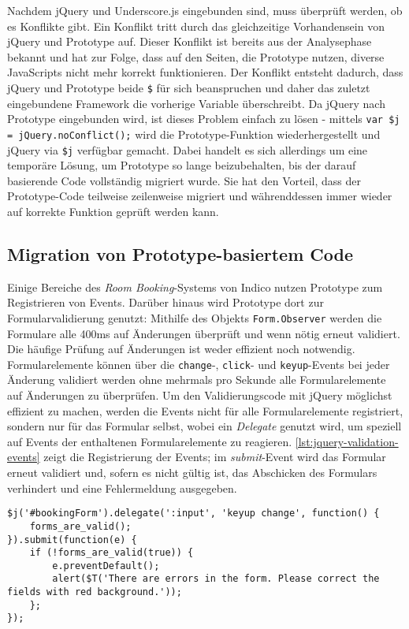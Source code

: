 Nachdem jQuery und Underscore.js eingebunden sind, muss überprüft werden, ob es Konflikte gibt. Ein
Konflikt tritt durch das gleichzeitige Vorhandensein von jQuery und Prototype auf. Dieser Konflikt
ist bereits aus der Analysephase bekannt und hat zur Folge, dass auf den Seiten, die Prototype
nutzen, diverse JavaScripts nicht mehr korrekt funktionieren. Der Konflikt entsteht dadurch, dass
jQuery und Prototype beide \lstinline{$} für sich beanspruchen und daher das zuletzt eingebundene
Framework die vorherige Variable überschreibt. Da jQuery nach Prototype eingebunden wird, ist dieses
Problem einfach zu lösen - mittels \lstinline{var $j = jQuery.noConflict();} wird die
Prototype-Funktion wiederhergestellt und jQuery via \lstinline{$j} verfügbar gemacht. Dabei handelt
es sich allerdings um eine temporäre Lösung, um Prototype so lange beizubehalten, bis der darauf
basierende Code vollständig migriert wurde. Sie hat den Vorteil, dass der Prototype-Code teilweise
zeilenweise migriert und währenddessen immer wieder auf korrekte Funktion geprüft werden kann.

\subsection{Migration von Prototype-basiertem Code}

Einige Bereiche des \emph{Room Booking}-Systems von Indico nutzen Prototype zum Registrieren von
Events. Darüber hinaus wird Prototype dort zur Formularvalidierung genutzt: Mithilfe des Objekts
\lstinline{Form.Observer} werden die Formulare alle 400ms auf Änderungen überprüft und wenn nötig
erneut validiert. Die häufige Prüfung auf Änderungen ist weder effizient noch notwendig.
Formularelemente können über die \lstinline{change}-, \lstinline{click}- und
\lstinline{keyup}-Events bei jeder Änderung validiert werden ohne mehrmals pro Sekunde alle
Formularelemente auf Änderungen zu überprüfen. Um den Validierungscode mit jQuery möglichst
effizient zu machen, werden die Events nicht für alle Formularelemente registriert, sondern nur für
das Formular selbst, wobei ein \emph{Delegate} genutzt wird, um speziell auf Events der enthaltenen
Formularelemente zu reagieren. \autoref{lst:jquery-validation-events} zeigt die Registrierung der
Events; im \emph{submit}-Event wird das Formular erneut validiert und, sofern es nicht gültig ist,
das Abschicken des Formulars verhindert und eine Fehlermeldung ausgegeben.

\begin{lstlisting}[caption=Formularvalidierung via jQuery,label=lst:jquery-validation-events]
$j('#bookingForm').delegate(':input', 'keyup change', function() {
    forms_are_valid();
}).submit(function(e) {
    if (!forms_are_valid(true)) {
        e.preventDefault();
        alert($T('There are errors in the form. Please correct the fields with red background.'));
    };
});
\end{lstlisting}


